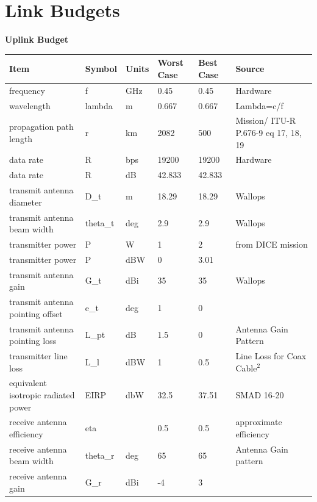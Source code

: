 \documentclass[12pt]{article}
\begin{document}
\section{Link Budgets} \label{app:link_budgets}
\textbf{Uplink Budget}
\small
\begin{center}
\begin{longtable}{| p{3.9cm} | p{1.6cm} | p{1.4cm} | p{1.4cm} | p{1.4cm} | p{5cm} |}
\hline
    \textbf{Item}  & \textbf{Symbol} & \textbf{Units}  & \textbf{Worst Case} & \textbf{Best Case} & \textbf{Source}  \\
    \hline \hline
    frequency & f     & GHz   & 0.45  & 0.45  & Hardware \\ \hline
    wavelength & lambda & m     & 0.667 & 0.667 & Lambda=c/f \\ \hline
    propagation path length & r     & km    & 2082  & 500   & Mission/ ITU-R P.676-9 eq 17, 18, 19 \\\hline
    data rate & R     & bps   & 19200 & 19200 & Hardware \\\hline
    data rate & R     & dB    & 42.833 & 42.833 &  \\\hline
    transmit antenna diameter & D\_t  & m     & 18.29 & 18.29 & Wallops \\\hline
    transmit antenna beam width & theta\_t & deg   & 2.9   & 2.9   & Wallops \\\hline
    transmitter power & P     & W     & 1     & 2     & from DICE mission \\\hline
    transmitter power & P     & dBW   & 0     & 3.01  &  \\\hline
    transmit antenna gain & G\_t  & dBi   & 35    & 35    & Wallops \\\hline
    transmit antenna pointing offset & e\_t  & deg   & 1     & 0     &  \\\hline
    transmit antenna pointing loss & L\_pt & dB    & 1.5   & 0     & Antenna Gain Pattern \\\hline
    transmitter line loss & L\_l  & dBW   & 1     & 0.5   & Line Loss for Coax Cable$^2$ \\\hline
    equivalent isotropic radiated power & EIRP  & dbW   & 32.5  & 37.51 & SMAD 16-20 \\\hline
    receive antenna efficiency & eta   &       & 0.5   & 0.5   & approximate efficiency \\\hline
    receive antenna beam width & theta\_r & deg   & 65    & 65    & Antenna Gain pattern \\\hline
    receive antenna gain & G\_r  & dBi   & -4    & 3     &  \\\hline

\end{longtable}
\end{center}
\end{document}
